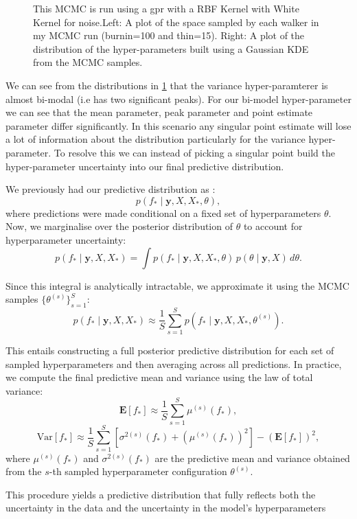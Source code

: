 \documentclass{article}
\begin{document}
\begin{figure}[H]
\begin{subfigure}[b]{0.48\textwidth}
    \end{subfigure}
    \caption{This MCMC is run using a gpr with a RBF Kernel with White Kernel for noise.Left: A plot of the space sampled by each walker in my MCMC run (burnin=100 and thin=15). \quad Right: A plot of the distribution of the hyper-parameters built using a Gaussian KDE from the MCMC samples.}
    \label{fig:MCMCresults}
\end{figure}
\noindent
We can see from the distributions in \ref{fig:MCMCresults} that the variance hyper-paramterer is almost bi-modal (i.e has two significant peaks). For our bi-model hyper-parameter we can see that the mean parameter, peak parameter and point estimate parameter differ significantly.
In this scenario any singular point estimate will lose a lot of information about the distribution particularly for the variance hyper-parameter. To resolve this we can instead of picking a singular point build
the hyper-parameter uncertainty into our final predictive distribution.


\noindent
We previously had our predictive distribution as :
\[
p(f_* \mid \mathbf{y}, X, X_*, \theta),
\]
where predictions were made conditional on a fixed set of hyperparameters \( \theta \). Now, we marginalise over the posterior distribution of \( \theta \) to account for hyperparameter uncertainty:
\[
p(f_* \mid \mathbf{y}, X, X_*) = \int p(f_* \mid \mathbf{y}, X, X_*, \theta) \, p(\theta \mid \mathbf{y}, X) \, d\theta.
\]

\noindent
Since this integral is analytically intractable, we approximate it using the MCMC samples \( \{\theta^{(s)}\}_{s=1}^S \):
\[
p(f_* \mid \mathbf{y}, X, X_*) \approx \frac{1}{S} \sum_{s=1}^{S} p(f_* \mid \mathbf{y}, X, X_*, \theta^{(s)}).
\]

\noindent
This entails constructing a full posterior predictive distribution for each set of sampled hyperparameters and then averaging across all predictions. In practice, we compute the final predictive mean and variance using the law of total variance:
\[
\mathbf{E}[f_*] \approx \frac{1}{S} \sum_{s=1}^{S} \mu^{(s)}(f_*),
\]
\[
\text{Var}[f_*] \approx \frac{1}{S} \sum_{s=1}^{S} \left[ \sigma^{2(s)}(f_*) + \left(\mu^{(s)}(f_*)\right)^2 \right] - \left( \mathbf{E}[f_*] \right)^2,
\]
where \( \mu^{(s)}(f_*) \) and \( \sigma^{2(s)}(f_*) \) are the predictive mean and variance obtained from the \( s \)-th sampled hyperparameter configuration \( \theta^{(s)} \).


\noindent
This procedure yields a predictive distribution that fully reflects both the uncertainty in the data and the uncertainty in the model's hyperparameters
\end{document}
